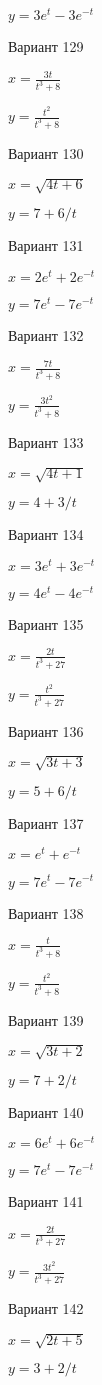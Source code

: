 \documentclass[11pt]{report}
\begin{document}
$y = 3 e^{t} - 3 e^{- t}$

Вариант 129

$x = \frac{3 t}{t^{3} + 8}$

$y = \frac{t^{2}}{t^{3} + 8}$

Вариант 130

$x = \sqrt{4 t + 6}$

$y = 7 + 6 / t$

Вариант 131

$x = 2 e^{t} + 2 e^{- t}$

$y = 7 e^{t} - 7 e^{- t}$

Вариант 132

$x = \frac{7 t}{t^{3} + 8}$

$y = \frac{3 t^{2}}{t^{3} + 8}$

Вариант 133

$x = \sqrt{4 t + 1}$

$y = 4 + 3 / t$

Вариант 134

$x = 3 e^{t} + 3 e^{- t}$

$y = 4 e^{t} - 4 e^{- t}$

Вариант 135

$x = \frac{2 t}{t^{3} + 27}$

$y = \frac{t^{2}}{t^{3} + 27}$

Вариант 136

$x = \sqrt{3 t + 3}$

$y = 5 + 6 / t$

Вариант 137

$x = e^{t} + e^{- t}$

$y = 7 e^{t} - 7 e^{- t}$

Вариант 138

$x = \frac{t}{t^{3} + 8}$

$y = \frac{t^{2}}{t^{3} + 8}$

Вариант 139

$x = \sqrt{3 t + 2}$

$y = 7 + 2 / t$

Вариант 140

$x = 6 e^{t} + 6 e^{- t}$

$y = 7 e^{t} - 7 e^{- t}$

Вариант 141

$x = \frac{2 t}{t^{3} + 27}$

$y = \frac{3 t^{2}}{t^{3} + 27}$

Вариант 142

$x = \sqrt{2 t + 5}$

$y = 3 + 2 / t$
\end{document}
